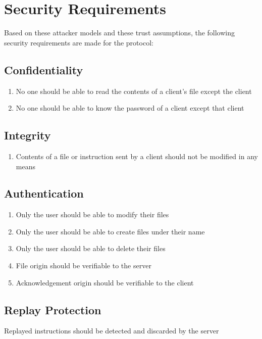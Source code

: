 \documentclass[12pt]{article}
\begin{document}
\section{Security Requirements}

Based on these attacker models and these trust assumptions, the following security requirements are made for the protocol:

\subsection{Confidentiality}
\begin{enumerate}
    \item No one should be able to read the contents of a client’s file except the client
    \item No one should be able to know the password of a client except that client
\end{enumerate}

\subsection{Integrity}
\begin{enumerate}
    \item Contents of a file or instruction sent by a client should not be modified in any means
\end{enumerate}

\subsection{Authentication}
\begin{enumerate}
    \item Only the user should be able to modify their files
    \item Only the user should be able to create files under their name
    \item Only the user should be able to delete their files
    \item File origin should be verifiable to the server
    \item Acknowledgement origin should be verifiable to the client
\end{enumerate}

\subsection{Replay Protection}
    Replayed instructions should be detected and discarded by the server
\end{document}

